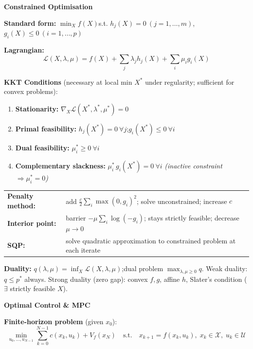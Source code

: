 \documentclass[10pt,a4paper]{article}
\newcommand{\sectionbox}[1]{%
  \begin{mdframed}[backgroundcolor=headbg, linewidth=0pt,
    innertopmargin=4pt, innerbottommargin=4pt,
    innerleftmargin=6pt, innerrightmargin=6pt]
    \large\bfseries\color{white}#1
  \end{mdframed}\vspace{2pt}
}
\newenvironment{notebox}{%
  \begin{mdframed}[backgroundcolor=notebg, linewidth=0.6pt,
    innertopmargin=4pt, innerbottommargin=4pt,
    innerleftmargin=8pt, innerrightmargin=8pt]
}{%
  \end{mdframed}
}
\begin{document}
\vspace{4pt}
\sectionbox{Constrained Optimisation}

\textbf{Standard form:}\quad
$\displaystyle\min_X f(X)$\quad s.t.\quad
$h_j(X)=0\ (j=1,\ldots,m)$,\quad
$g_i(X)\le 0\ (i=1,\ldots,p)$

\textbf{Lagrangian:}
\[
  \mathcal{L}(X,\lambda,\mu) = f(X) + \textstyle\sum_{j}\lambda_j h_j(X) + \textstyle\sum_{i}\mu_i g_i(X)
\]

\begin{notebox}
\textbf{KKT Conditions} (necessary at local min $X^*$ under regularity; sufficient for convex problems):
\begin{enumerate}
  \item \textbf{Stationarity:} $\nabla_X \mathcal{L}(X^*,\lambda^*,\mu^*) = 0$
  \item \textbf{Primal feasibility:} $h_j(X^*)=0\ \forall j$;\quad $g_i(X^*)\le 0\ \forall i$
  \item \textbf{Dual feasibility:} $\mu_i^* \ge 0\ \forall i$
  \item \textbf{Complementary slackness:} $\mu_i^*\,g_i(X^*)=0\ \forall i$
    \hfill\textit{(inactive constraint $\Rightarrow \mu_i^*=0$)}
\end{enumerate}
\end{notebox}

\begin{tabular}{@{}ll@{}}
\textbf{Penalty method:} & add $\tfrac{c}{2}\sum_i\max(0,g_i)^2$; solve unconstrained; increase $c$ \\
\textbf{Interior point:} & barrier $-\mu\sum_i\log(-g_i)$; stays strictly feasible; decrease $\mu\to 0$ \\
\textbf{SQP:} & solve quadratic approximation to constrained problem at each iterate \\
\end{tabular}

\vspace{2pt}
\textbf{Duality:} $q(\lambda,\mu)=\inf_X \mathcal{L}(X,\lambda,\mu)$;\quad dual problem $\max_{\lambda,\mu\ge 0}q$.\quad
Weak duality: $q \le p^*$ always.\quad
Strong duality (zero gap): convex $f,g$, affine $h$, Slater's condition ($\exists$ strictly feasible $X$).

\vspace{4pt}
\sectionbox{Optimal Control \& MPC}

\textbf{Finite-horizon problem} (given $x_0$):
\[
  \min_{u_0,\ldots,u_{N-1}} \sum_{k=0}^{N-1} c(x_k,u_k) + V_f(x_N)
  \quad\text{s.t.}\quad x_{k+1}=f(x_k,u_k),\; x_k\in\mathcal{X},\; u_k\in\mathcal{U}
\]
\end{document}

